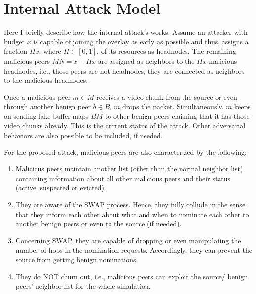 \section{Internal Attack Model}
\label{sec:Attack}

Here I briefly describe how the internal attack's works.
Assume an attacker with budget $x$ is capable of joining the overlay as early as possible and thus, assigns a fraction $Hx$, where $H\in [0,1]$, of its resources as headnodes.
The remaining malicious peers $MN=x-Hx$ are assigned as neighbors to the $Hx$ malicious headnodes, i.e., those peers are not headnodes, they are connected as neighbors to the malicious headnodes. 

Once a malicious peer $m\in M$ receives a video-chunk from the source or even through another benign peer $b \in B$, $m$ drops the packet. 
Simultaneously, $m$ keeps on sending fake buffer-maps $BM$ to other benign peers claiming that it has those video chunks already. 
This is the current status of the attack. Other adversarial behaviors are also possible to be included, if needed.

For the proposed attack, malicious peers are also characterized by the following:
\begin{enumerate}
 \item Malicious peers maintain another list (other than the normal neighbor list) containing information about all other malicious peers and their status (active, suspected or evicted).
 \item They are aware of the SWAP process. 
 Hence, they fully collude in the sense that they inform each other about what and when to nominate each other to another benign peers or even to the source (if needed).
 \item Concerning SWAP, they are capable of dropping or even manipulating the number of hops in the nomination requests. Accordingly, they can prevent the source from getting benign nominations.
 \item They do NOT churn out, i.e., malicious peers can exploit the source/ benign peers' neighbor list for the whole simulation.
\end{enumerate}



